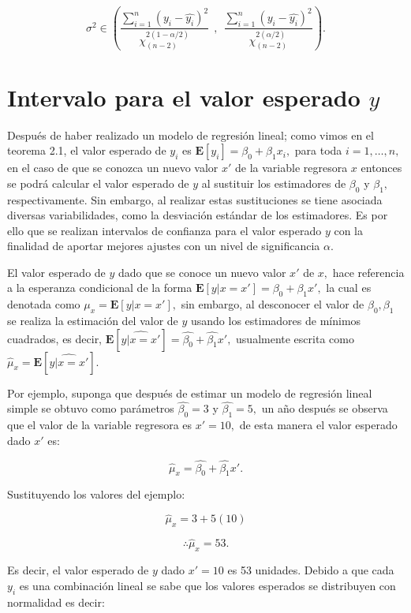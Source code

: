 \documentclass[
  a4paper,
  oneside,
  openany]{book}
\begin{document}
\[\sigma^2 \in \left( \frac{\sum_{i=1}^{n}(y_i-\hat{y_{i}})^2}{\chi^{2(1-\alpha/2)}_{(n-2)}} \ \ , \ \ \frac{\sum_{i=1}^{n}(y_i-\hat{y_{i}})^2} {\chi^{2(\alpha/2)}_{(n-2)}} \right).\]

\hypertarget{intervalo-para-el-valor-esperado-y}{%
\section{\texorpdfstring{Intervalo para el valor esperado \(y\)}{Intervalo para el valor esperado y}}\label{intervalo-para-el-valor-esperado-y}}

Después de haber realizado un modelo de regresión lineal; como vimos en el teorema 2.1, el valor esperado de \(y_{i}\) es \(\mathbf{E}[y_{i}]=\beta_{0}+\beta_{1}x_{i},\) para toda \(i=1,\ldots,n,\) en el caso de que se conozca un nuevo valor \(x'\) de la variable regresora \(x\) entonces se podrá calcular el valor esperado de \(y\) al sustituir los estimadores de \(\beta_{0}\) y \(\beta_{1},\) respectivamente. Sin embargo, al realizar estas sustituciones se tiene asociada diversas variabilidades, como la desviación estándar de los estimadores. Es por ello que se realizan intervalos de confianza para el valor esperado \(y\) con la finalidad de aportar mejores ajustes con un nivel de significancia \(\alpha.\)

El valor esperado de \(y\) dado que se conoce un nuevo valor \(x'\) de \(x,\) hace referencia a la esperanza condicional de la forma \(\mathbf{E}[y|x=x']=\beta_{0}+\beta_{1}x',\) la cual es denotada como \(\mu_{x}=\mathbf{E}[y|x=x' ],\) sin embargo, al desconocer el valor de \(\beta_{0},\beta_{1}\) se realiza la estimación del valor de \(y\) usando los estimadores de mínimos cuadrados, es decir, \(\mathbf{E}[\widehat{y|x=x'}]=\hat{\beta_{0}}+\hat{\beta_{1}}x',\) usualmente escrita como \(\hat{\mu}_{x}=\mathbf{E}[\widehat{y|x=x'}].\)

Por ejemplo, suponga que después de estimar un modelo de regresión lineal simple se obtuvo como parámetros \(\hat{\beta_{0}}=3\) y \(\hat{\beta_{1}}=5,\) un año después se observa que el valor de la variable regresora es \(x'=10,\) de esta manera el valor esperado dado \(x'\) es:

\[\hat{\mu}_{x}=\hat{\beta_{0}}+\hat{\beta_{1}}x'.\]

Sustituyendo los valores del ejemplo:

\[\hat{\mu}_{x}=3+5(10)\]

\[\therefore \hat{\mu}_{x}=53.\]

Es decir, el valor esperado de \(y\) dado \(x'=10\) es 53 unidades. Debido a que cada \(y_{i}\) es una combinación lineal se sabe que los valores esperados se distribuyen con normalidad es decir:
\end{document}
